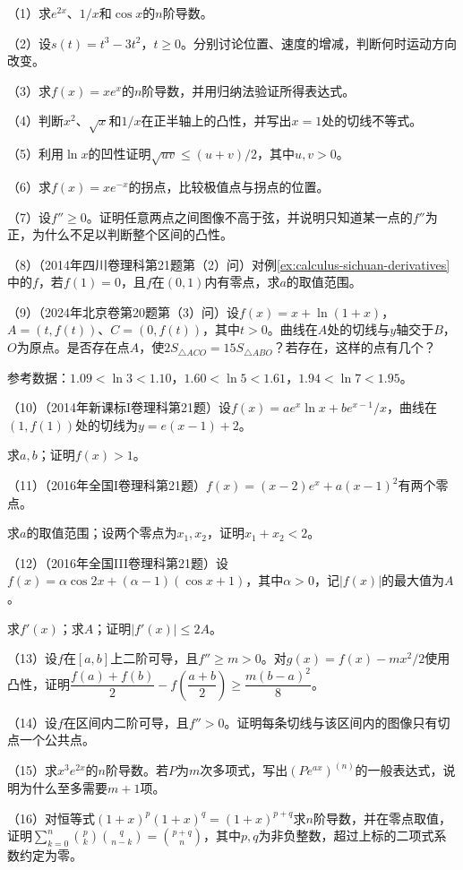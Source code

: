 \FloatBarrier
\setlength{\parskip}{6pt}
\begin{exercise}
\mbox{}\par\nobreak

（1）求\(e^{2x}\)、\(1/x\)和\(\cos x\)的\(n\)阶导数。

（2）设\(s(t)=t^3-3t^2\)，\(t\ge0\)。分别讨论位置、速度的增减，判断何时运动方向改变。

（3）求\(f(x)=x e^x\)的\(n\)阶导数，并用归纳法验证所得表达式。

（4）判断\(x^2\)、\(\sqrt x\)和\(1/x\)在正半轴上的凸性，并写出\(x=1\)处的切线不等式。

（5）利用\(\ln x\)的凹性证明\(\sqrt{uv}\le(u+v)/2\)，其中\(u,v>0\)。

（6）求\(f(x)=x e^{-x}\)的拐点，比较极值点与拐点的位置。

（7）设\(f''\ge0\)。证明任意两点之间图像不高于弦，并说明只知道某一点的\(f''\)为正，为什么不足以判断整个区间的凸性。

（8）（2014年四川卷理科第21题第（2）问）对例\ref{ex:calculus-sichuan-derivatives}中的\(f\)，若\(f(1)=0\)，且\(f\)在\((0,1)\)内有零点，求\(a\)的取值范围。

（9）（2024年北京卷第20题第（3）问）设\(f(x)=x+\ln(1+x)\)，\(A=(t,f(t))\)、\(C=(0,f(t))\)，其中\(t>0\)。曲线在\(A\)处的切线与\(y\)轴交于\(B\)，\(O\)为原点。是否存在点\(A\)，使\(2S_{\triangle ACO}=15S_{\triangle ABO}\)？若存在，这样的点有几个？

参考数据：\(1.09<\ln3<1.10\)，\(1.60<\ln5<1.61\)，\(1.94<\ln7<1.95\)。

（10）（2014年新课标I卷理科第21题）设\(f(x)=ae^x\ln x+be^{x-1}/x\)，曲线在\((1,f(1))\)处的切线为\(y=e(x-1)+2\)。

求\(a,b\)；证明\(f(x)>1\)。

（11）（2016年全国I卷理科第21题）\(f(x)=(x-2)e^x+a(x-1)^2\)有两个零点。

求\(a\)的取值范围；设两个零点为\(x_1,x_2\)，证明\(x_1+x_2<2\)。

（12）（2016年全国III卷理科第21题）设\(f(x)=\alpha\cos2x+(\alpha-1)(\cos x+1)\)，其中\(\alpha>0\)，记\(|f(x)|\)的最大值为\(A\)。

求\(f'(x)\)；求\(A\)；证明\(|f'(x)|\le2A\)。

（13）设\(f\)在\([a,b]\)上二阶可导，且\(f''\ge m>0\)。对\(g(x)=f(x)-mx^2/2\)使用凸性，证明\(\dfrac{f(a)+f(b)}2-f\!\left(\dfrac{a+b}2\right)\ge\dfrac{m(b-a)^2}8\)。

（14）设\(f\)在区间内二阶可导，且\(f''>0\)。证明每条切线与该区间内的图像只有切点一个公共点。

（15）求\(x^3e^{2x}\)的\(n\)阶导数。若\(P\)为\(m\)次多项式，写出\((Pe^{ax})^{(n)}\)的一般表达式，说明为什么至多需要\(m+1\)项。

（16）对恒等式\((1+x)^p(1+x)^q=(1+x)^{p+q}\)求\(n\)阶导数，并在零点取值，证明\(\sum_{k=0}^n\binom pk\binom q{n-k}=\binom{p+q}n\)，其中\(p,q\)为非负整数，超过上标的二项式系数约定为零。
\end{exercise}
\endgroup

